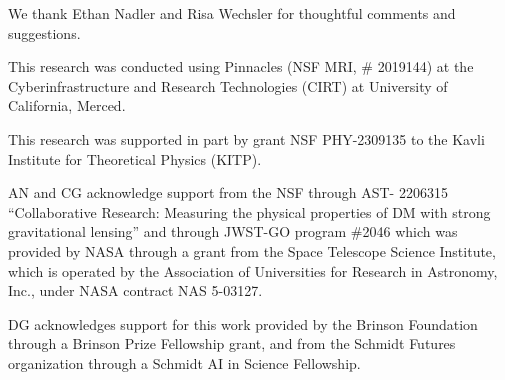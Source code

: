 \documentclass[%
 reprint,
 amsmath,
 amssymb,
 aps,
prd,
twocolumn,
superscriptaddress,
preprintnumbers,
floatfix,
nofootinbib
]{revtex4-2}
\begin{document}
\begin{acknowledgments}
We thank Ethan Nadler and Risa Wechsler for thoughtful comments and suggestions.

This research was conducted using Pinnacles (NSF MRI, \# 2019144) at the Cyberinfrastructure and Research Technologies (CIRT) at University of California, Merced.

This research was supported in part by grant NSF PHY-2309135 to the Kavli Institute for Theoretical Physics (KITP).

AN and CG acknowledge support from the NSF through AST-
2206315 “Collaborative Research: Measuring the physical properties of DM with strong gravitational lensing” and through JWST-GO program \#2046 which was provided by NASA
through a grant from the Space Telescope Science Institute, which is
operated by the Association of Universities for Research in Astronomy, Inc., under NASA contract NAS 5-03127.

DG acknowledges support for this work provided by the Brinson Foundation through a Brinson Prize Fellowship grant, and from the Schmidt Futures organization through a Schmidt AI in Science Fellowship.



\end{acknowledgments}
\end{document}
